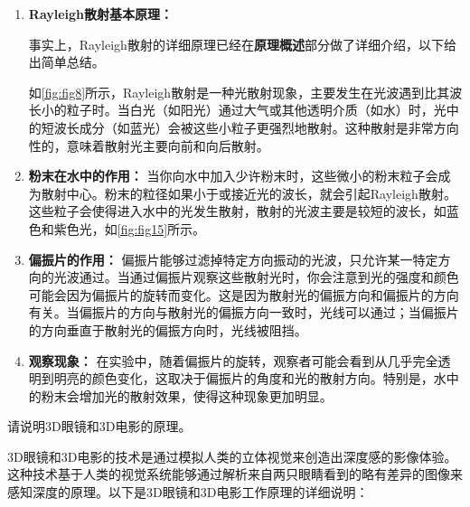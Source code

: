 \documentclass[dvipsnames, svgnames,a4paper,11pt]{article}
\begin{document}
	\begin{enumerate}
		\item \textbf{Rayleigh散射基本原理：}
		
		事实上，Rayleigh散射的详细原理已经在\textbf{原理概述}部分做了详细介绍，以下给出简单总结。
		
		如\cref{fig:fig8}所示，Rayleigh散射是一种光散射现象，主要发生在光波遇到比其波长小的粒子时。当白光（如阳光）通过大气或其他透明介质（如水）时，光中的短波长成分（如蓝光）会被这些小粒子更强烈地散射。这种散射是非常方向性的，意味着散射光主要向前和向后散射。
		
		\item \textbf{粉末在水中的作用：}
		当你向水中加入少许粉末时，这些微小的粉末粒子会成为散射中心。粉末的粒径如果小于或接近光的波长，就会引起Rayleigh散射。这些粒子会使得进入水中的光发生散射，散射的光波主要是较短的波长，如蓝色和紫色光，如\cref{fig:fig15}所示。
		
		\item \textbf{偏振片的作用：}
		偏振片能够过滤掉特定方向振动的光波，只允许某一特定方向的光波通过。当通过偏振片观察这些散射光时，你会注意到光的强度和颜色可能会因为偏振片的旋转而变化。这是因为散射光的偏振方向和偏振片的方向有关。当偏振片的方向与散射光的偏振方向一致时，光线可以通过；当偏振片的方向垂直于散射光的偏振方向时，光线被阻挡。
		
		\item \textbf{观察现象：}
		在实验中，随着偏振片的旋转，观察者可能会看到从几乎完全透明到明亮的颜色变化，这取决于偏振片的角度和光的散射方向。特别是，水中的粉末会增加光的散射效果，使得这种现象更加明显。
	\end{enumerate}
	
	
	\begin{question}
		请说明3D眼镜和3D电影的原理。
	\end{question}
	3D眼镜和3D电影的技术是通过模拟人类的立体视觉来创造出深度感的影像体验。这种技术基于人类的视觉系统能够通过解析来自两只眼睛看到的略有差异的图像来感知深度的原理。以下是3D眼镜和3D电影工作原理的详细说明：
	
\end{document}
